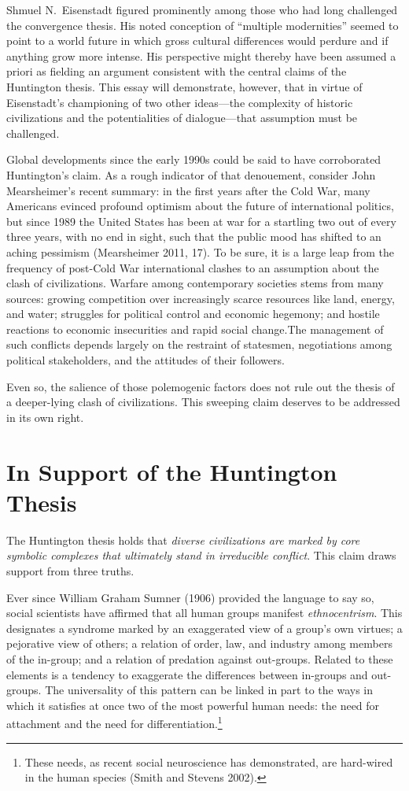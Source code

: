 Shmuel N.~Eisenstadt figured prominently among those who had long challenged the convergence thesis. His noted conception of ``multiple modernities'' seemed to point to a world future in which gross cultural differences would perdure and if anything grow more intense. His perspective might thereby have been assumed a priori as fielding an argument consistent with the central claims of the Huntington thesis. This essay will demonstrate, however, that in virtue of Eisenstadt's championing of two other ideas---the complexity of historic civilizations and the potentialities of dialogue---that assumption must be challenged.

Global developments since the early 1990s could be said to have corroborated Huntington's claim. As a rough indicator of that denouement, consider John Mearsheimer's recent summary: in the first years after the Cold War, many Americans evinced profound optimism about the future of international politics, but since 1989 the United States has been at war for a startling two out of every three years, with no end in sight, such that the public mood has shifted to an aching pessimism (Mearsheimer 2011, 17). To be sure, it is a large leap from the frequency of post-Cold War international clashes to an assumption about the clash of civilizations. Warfare among contemporary societies stems from many sources: growing competition over increasingly scarce resources like land, energy, and water; struggles for political control and economic hegemony; and hostile reactions to economic insecurities and rapid social change.The management of such conflicts depends largely on the restraint of statesmen, negotiations among political stakeholders, and the attitudes of their followers. 

Even so, the salience of those polemogenic factors does not rule out the thesis of a deeper-lying clash of civilizations. This sweeping claim deserves to be addressed in its own right. 

\section*{In Support of the Huntington Thesis}

The Huntington thesis holds that \emph{diverse civilizations are marked by core symbolic complexes that ultimately stand in irreducible conflict}. This claim draws support from three truths.

Ever since William Graham Sumner (1906) provided the language to say so, social scientists have affirmed that all human groups manifest \emph{ethnocentrism}. This designates a syndrome marked by an exaggerated view of a group's own virtues; a pejorative view of others; a relation of order, law, and industry among members of the in-group; and a relation of predation against out-groups. Related to these elements is a tendency to exaggerate the differences between in-groups and out-groups. The universality of this pattern can be linked in part to the ways in which it satisfies at once two of the most powerful human needs: the need for attachment and the need for differentiation.\footnote{These needs, as recent social neuroscience has demonstrated, are hard-wired in the human species (Smith and Stevens 2002).}

